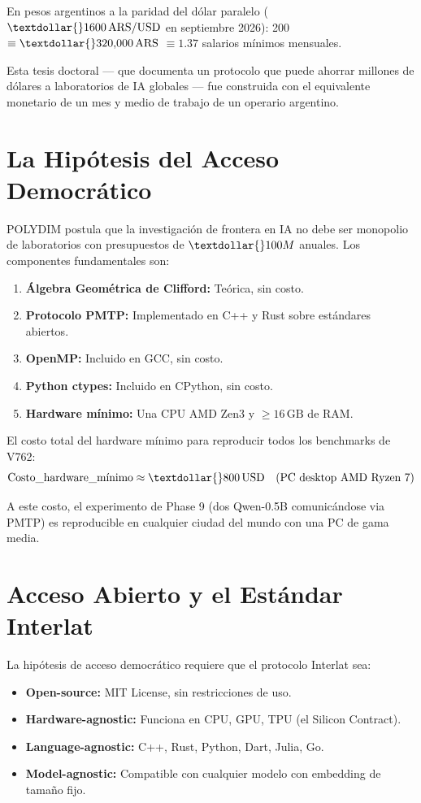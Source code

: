 ﻿\documentclass{article}
\begin{document}
En pesos argentinos a la paridad del dólar paralelo ($\textdollar{}1600\,\text{ARS/USD}$ en septiembre 2026):
\textdollar{}200\, $\equiv \textdollar{}320{,}000\,\text{ARS}$ $\equiv 1.37$ salarios mínimos mensuales.

Esta tesis doctoral --- que documenta un protocolo que puede ahorrar millones de
dólares a laboratorios de IA globales --- fue construida con el equivalente monetario
de un mes y medio de trabajo de un operario argentino.

\section{La Hipótesis del Acceso Democrático}

POLYDIM postula que la investigación de frontera en IA no debe ser monopolio de
laboratorios con presupuestos de $\textdollar{}100M$ anuales. Los componentes fundamentales son:

\begin{enumerate}
\item \textbf{Álgebra Geométrica de Clifford:} Teórica, sin costo.
\item \textbf{Protocolo PMTP:} Implementado en C++ y Rust sobre estándares abiertos.
\item \textbf{OpenMP:} Incluido en GCC, sin costo.
\item \textbf{Python ctypes:} Incluido en CPython, sin costo.
\item \textbf{Hardware mínimo:} Una CPU AMD Zen3 y $\ge 16\,\text{GB}$ de RAM.
\end{enumerate}

El costo total del hardware mínimo para reproducir todos los benchmarks de V762:
\begin{equation}
\text{Costo\_hardware\_mínimo} \approx \textdollar{}800\,\text{USD} \quad \text{(PC desktop AMD Ryzen 7)}
\end{equation}

A este costo, el experimento de Phase 9 (dos Qwen-0.5B comunicándose via PMTP)
es reproducible en cualquier ciudad del mundo con una PC de gama media.

\section{Acceso Abierto y el Estándar Interlat}

La hipótesis de acceso democrático requiere que el protocolo Interlat sea:
\begin{itemize}
\item \textbf{Open-source:} MIT License, sin restricciones de uso.
\item \textbf{Hardware-agnostic:} Funciona en CPU, GPU, TPU (el Silicon Contract).
\item \textbf{Language-agnostic:} C++, Rust, Python, Dart, Julia, Go.
\item \textbf{Model-agnostic:} Compatible con cualquier modelo con embedding de tamaño fijo.
\end{itemize}
\end{document}
